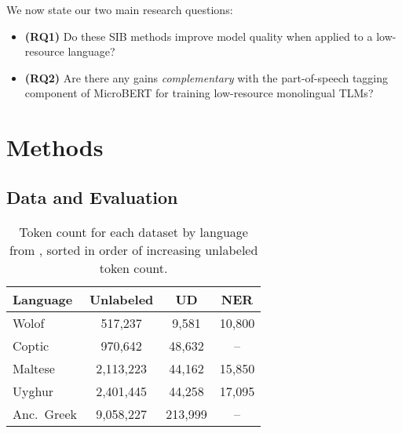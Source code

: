 \documentclass[11pt]{article}
\begin{document}
We now state our two main research questions:
\begin{itemize}
    \item \textbf{(RQ1)} Do these SIB methods improve model quality when applied to a low-resource language?
    \item \textbf{(RQ2)} Are there any gains \textit{complementary} with the part-of-speech tagging component of MicroBERT for training low-resource monolingual TLMs?
\end{itemize}



\section{Methods}
\subsection{Data and Evaluation}
\begin{table}[]
    \centering
    \small
    \begin{tabular}{l|ccc}
Language   & Unlabeled & UD & NER\\\hline
Wolof      &  \hphantom{0,}517,237 &   \hphantom{00}9,581 &   10,800 \\
Coptic     &  \hphantom{0,}970,642 &   \hphantom{0}48,632 &       -- \\
Maltese    &  2,113,223 &   \hphantom{0}44,162 &   15,850 \\
Uyghur     &  2,401,445 &   \hphantom{0}44,258 &   17,095 \\
Anc.~Greek &  9,058,227 &  213,999 &       -- \\
    \end{tabular}
    \caption{Token count for each dataset by language from \citet{gessler-zeldes-2022-microbert}, sorted in order of increasing unlabeled token count.}
    \label{tab:token_stats}
\end{table}
\end{document}
